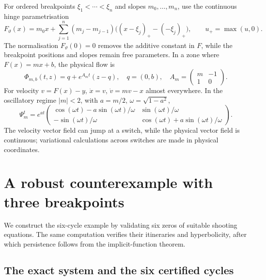 \documentclass[11pt]{article}
\theoremstyle{remark}
\begin{document}
For ordered breakpoints \(\xi_1<\cdots<\xi_n\) and slopes
\(m_0,\ldots,m_n\), use the continuous hinge parametrisation
\begin{equation}\label{eq:hinge}
 F_\vartheta(x)=m_0x+\sum_{j=1}^n(m_j-m_{j-1})
 \bigl((x-\xi_j)_+-(-\xi_j)_+\bigr),\qquad u_+=\max(u,0).
\end{equation}
The normalisation \(F_\vartheta(0)=0\) removes the additive constant
in \(F\), while the breakpoint positions and slopes remain free parameters.
In a zone where \(F(x)=mx+b\), the
physical flow is
\begin{equation}\label{eq:physical-flow}
 \Phi_{m,b}(t,z)=q+e^{A_mt}(z-q),\quad
 q=(0,b),\quad A_m=\begin{pmatrix}m&-1\\1&0\end{pmatrix}.
\end{equation}
For velocity \(v=F(x)-y\), \(\dot x=v\), \(\dot v=mv-x\) almost
everywhere.  In the oscillatory regime \(|m|<2\), with
\(a=m/2\), \(\omega=\sqrt{1-a^2}\),
\begin{equation}\label{eq:velocity-flow}
 \Psi_m^t=e^{at}
 \begin{pmatrix}
 \cos(\omega t)-a\sin(\omega t)/\omega&\sin(\omega t)/\omega\\
 -\sin(\omega t)/\omega&\cos(\omega t)+a\sin(\omega t)/\omega
 \end{pmatrix}.
\end{equation}
The velocity vector field can jump at a switch, while the physical vector
field is continuous; variational calculations across switches are made in
physical coordinates.

\section{A robust counterexample with three breakpoints}\label{sec:six}

We construct the six-cycle example by validating six zeros of suitable
shooting equations.  The same computation verifies their itineraries and
hyperbolicity, after which persistence follows from the implicit-function
theorem.

\subsection{The exact system and the six certified cycles}
\end{document}
